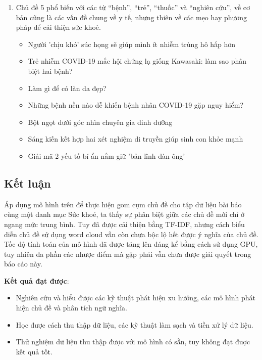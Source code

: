 \begin{enumerate}
    \item Chủ đề 5 phổ biến với các từ ``bệnh'', ``trẻ'', ``thuốc'' và ``nghiên cứu'',
        về cơ bản cũng là các vấn đề chung về y tế, nhưng thiên về các mẹo hay phương pháp để cải thiện sức khoẻ.
        \begin{itemize}
            \item Người 'chịu khó' súc họng sẽ giúp mình ít nhiễm trùng hô hấp hơn
            \item Trẻ nhiễm COVID-19 mắc hội chứng lạ giống Kawasaki: làm sao phân biệt hai bệnh?
            \item Làm gì để có làn da đẹp?
            \item Những bệnh nền nào dễ khiến bệnh nhân COVID-19 gặp nguy hiểm?
            \item Bột ngọt dưới góc nhìn chuyên gia dinh dưỡng
            \item Sáng kiến kết hợp hai xét nghiệm di truyền giúp sinh con khỏe mạnh
            \item Giải mã 2 yếu tố bí ẩn nắm giữ 'bản lĩnh đàn ông'
        \end{itemize}
\end{enumerate}







\subsection{Kết luận}
Áp dụng mô hình trên để thực hiện gom cụm chủ đề cho tập dữ liệu bài báo cùng
một danh mục Sức khoẻ, ta thấy sự phân biệt giữa các chủ đề mới chỉ ở ngang mức
trung bình. Tuy đã được cải thiện bằng TF-IDF, nhưng cách biểu diễn chủ đề sử
dụng word cloud vẫn còn chưa bộc lộ hết được ý nghĩa của chủ đề. Tốc độ tính
toán của mô hình đã được tăng lên đáng kể bằng cách sử dụng GPU, tuy nhiên đa
phần các nhược điểm mà \cite{lamGomCumVan2021} gặp phải vẫn chưa được giải
quyết trong báo cáo này.

\textbf{Kết quả đạt được}:
\begin{itemize}
    \item Nghiên cứu và hiểu được các kỹ thuật phát hiện xu hướng, các mô hình
        phát hiện chủ đề và phân tích ngữ nghĩa.
    \item Học được cách thu thập dữ liệu, các kỹ thuật làm sạch và tiền xử lý
        dữ liệu.
    \item Thử nghiệm dữ liệu thu thập được với mô hình có sẵn, tuy không đạt
        đuợc kết quả tốt.
\end{itemize}
